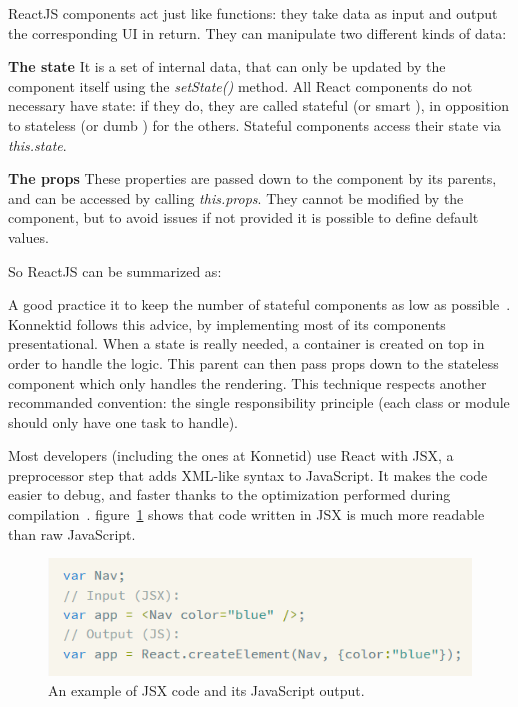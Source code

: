 ReactJS components act just like functions: they take data as input and output the corresponding UI in return. They can manipulate two different kinds of data:

\textbf{The state} It is a set of internal data, that can only be updated by the component itself using the \textit{setState()}  method. All React components do not necessary have state: if they do, they are called \guillemotleft{} stateful \guillemotright{} (or \guillemotleft{} smart \guillemotright{}), in opposition to \guillemotleft{} stateless \guillemotright{} (or \guillemotleft{} dumb \guillemotright{}) for the others. Stateful components access their state via \textit{this.state}.

\textbf{The props} These properties are passed down to the component by its parents, and can be accessed by calling \textit{this.props}. They cannot be modified by the component, but to avoid issues if not provided it is possible to define default values.

So ReactJS can be summarized as: 

A good practice it to keep the number of stateful components as low as possible~\cite{state}. Konnektid follows this advice, 
by implementing most of its components presentational. When a state is really needed, a \guillemotleft{} container \guillemotright{} is created on top in order to handle the logic. This parent can then pass props down to the stateless component which only handles the rendering. This technique respects another recommanded convention: the single responsibility principle (each class or module should only have one task to handle). 

Most developers (including the ones at Konnetid) use React with JSX, a preprocessor step that adds XML-like syntax to JavaScript.
It makes the code easier to debug, and faster thanks to the optimization performed during compilation~\cite{whyJsx}. {\sc figure}~\ref{fig:jsx} shows that code written in JSX is much more readable than raw JavaScript.

\begin{figure}[H]
    \centering
    \includegraphics[scale=0.9]{figure/jsx.png}
    \caption{An example of JSX code and its JavaScript output.}
    \label{fig:jsx}
\end{figure}

